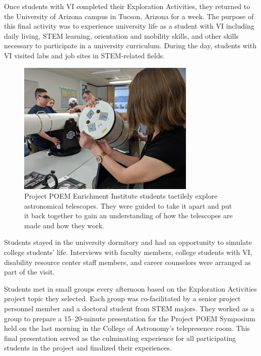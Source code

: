 \documentclass[11pt]{sig-alternate}
\begin{document}
\begin{large}
Once students with VI completed their Exploration Activities, they returned to the University of Arizona campus in Tucson, Arizona for a week. The purpose of this final activity was to experience university life as a student with VI including daily living, STEM learning, orientation and mobility skills, and other skills necessary to participate in a university curriculum. During the day, students with VI visited labs and job sites in STEM-related fields. 
{\begin{figure}[htp] 
    \leftmargin
    \includegraphics[width=8.5cm]{Project POEM students learn about the parts of a telescope. They are able to take it apart and examine how the telescope is assembled..jpg}
    \caption{Project POEM Enrichment Institute students tactilely explore astronomical telescopes. They were guided to take it apart and put it back together to gain an understanding of how the telescopes are made and how they work. }
    \label{Project POEM students learn about the parts of a telescope. They are able to take it apart and examine how the telescope is assembled.}
\end{figure}
Students stayed in the university dormitory and had an opportunity to simulate college students’ life. Interviews with faculty members, college students with VI, disability resource center staff members, and career counselors were arranged as part of the visit.

Students met in small groups every afternoon based on the Exploration Activities project topic they selected. Each group was co-facilitated by a senior project personnel member and a doctoral student from STEM majors. They worked as a group to prepare a 15–20-minute presentation for the Project POEM Symposium held on the last morning in the College of Astronomy’s telepresence room. This final presentation served as the culminating experience for all participating students in the project and finalized their experiences. 

}
\end{large}
\end{document}
